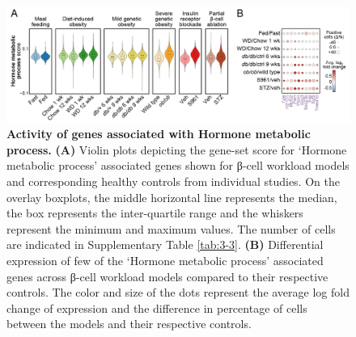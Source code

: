 \begin{figure}[t]
\centering
\includegraphics[width=\linewidth]{Chapter5/Fig/F3-13-02.png}
\caption[Scoring of gene-set - \textit{Hormone Metabolic process}]{\textbf{Activity of genes associated with Hormone metabolic process.} \textbf{(A)} Violin plots depicting the gene-set score for `Hormone metabolic process' associated genes shown for β-cell workload models and corresponding healthy controls from individual studies. On the overlay boxplots, the middle horizontal line represents the median, the box represents the inter-quartile range and the whiskers represent the minimum and maximum values. The number of cells are indicated in Supplementary Table \ref{tab:3-3}. \textbf{(B)} Differential expression of few of the `Hormone metabolic process' associated genes across β-cell workload models compared to their respective controls. The color and size of the dots represent the average log fold change of expression and the difference in percentage of cells between the models and their respective controls.}
\label{fig:chp3_gs_hm}
\end{figure}


